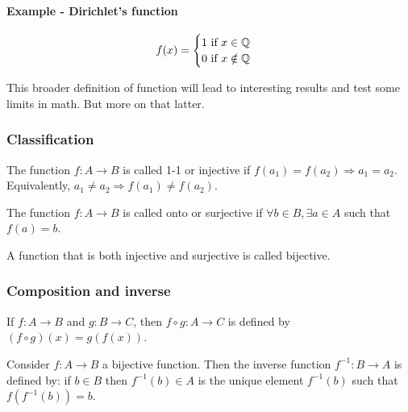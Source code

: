 \paragraph{Example - Dirichlet's function}

\begin{equation}
    f(x) = \begin{cases}
        1 \text{ if } x \in \mathbb{Q} \\
        0 \text{ if } x \notin \mathbb{Q}
    \end{cases}
\end{equation}

This broader definition of function will lead to interesting results and test some limits in math. But more on that latter.

\subsubsection{Classification}

\begin{definition}
    The function $f: A \to B$ is called 1-1 or injective if $f(a_1) = f(a_2) \Rightarrow a_1 = a_2$. Equivalently, $a_1 \neq a_2 \Rightarrow f(a_1) \neq f(a_2)$.
\end{definition}

\begin{definition}
    The function $f: A \to B$ is called onto or surjective if $\forall b \in B, \exists a \in A$ such that $ f(a) = b$.
\end{definition}

\begin{definition}
    A function that is both injective and surjective is called bijective.
\end{definition}

\subsubsection{Composition and inverse}

\begin{definition}
    If $f: A \to B$ and $g: B \to C$, then $f \circ g: A \to C$ is defined by $(f \circ g)(x) = g(f(x))$.
\end{definition}

\begin{definition}
    Consider $f: A \to B$ a bijective function. Then the inverse function $f^{-1}: B \to A$ is defined by: if $b \in B$ then $f^{-1}(b) \in A$ is the unique element $f^{-1}(b)$ such that $f(f^{-1}(b)) = b$.
\end{definition}

